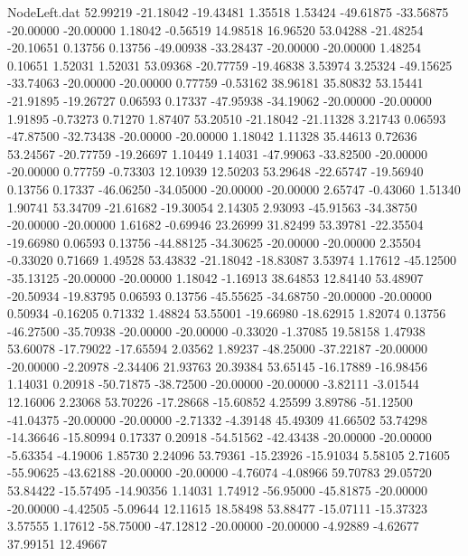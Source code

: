 \begin{filecontents}{NodeLeft.dat}
  52.99219  -21.18042  -19.43481     1.35518    1.53424  -49.61875  -33.56875  -20.00000  -20.00000    1.18042   -0.56519   14.98518   16.96520
  53.04288  -21.48254  -20.10651     0.13756    0.13756  -49.00938  -33.28437  -20.00000  -20.00000    1.48254    0.10651    1.52031    1.52031
  53.09368  -20.77759  -19.46838     3.53974    3.25324  -49.15625  -33.74063  -20.00000  -20.00000    0.77759   -0.53162   38.96181   35.80832
  53.15441  -21.91895  -19.26727     0.06593    0.17337  -47.95938  -34.19062  -20.00000  -20.00000    1.91895   -0.73273    0.71270    1.87407
  53.20510  -21.18042  -21.11328     3.21743    0.06593  -47.87500  -32.73438  -20.00000  -20.00000    1.18042    1.11328   35.44613    0.72636
  53.24567  -20.77759  -19.26697     1.10449    1.14031  -47.99063  -33.82500  -20.00000  -20.00000    0.77759   -0.73303   12.10939   12.50203
  53.29648  -22.65747  -19.56940     0.13756    0.17337  -46.06250  -34.05000  -20.00000  -20.00000    2.65747   -0.43060    1.51340    1.90741
  53.34709  -21.61682  -19.30054     2.14305    2.93093  -45.91563  -34.38750  -20.00000  -20.00000    1.61682   -0.69946   23.26999   31.82499
  53.39781  -22.35504  -19.66980     0.06593    0.13756  -44.88125  -34.30625  -20.00000  -20.00000    2.35504   -0.33020    0.71669    1.49528
  53.43832  -21.18042  -18.83087     3.53974    1.17612  -45.12500  -35.13125  -20.00000  -20.00000    1.18042   -1.16913   38.64853   12.84140
  53.48907  -20.50934  -19.83795     0.06593    0.13756  -45.55625  -34.68750  -20.00000  -20.00000    0.50934   -0.16205    0.71332    1.48824
  53.55001  -19.66980  -18.62915     1.82074    0.13756  -46.27500  -35.70938  -20.00000  -20.00000   -0.33020   -1.37085   19.58158    1.47938
  53.60078  -17.79022  -17.65594     2.03562    1.89237  -48.25000  -37.22187  -20.00000  -20.00000   -2.20978   -2.34406   21.93763   20.39384
  53.65145  -16.17889  -16.98456     1.14031    0.20918  -50.71875  -38.72500  -20.00000  -20.00000   -3.82111   -3.01544   12.16006    2.23068
  53.70226  -17.28668  -15.60852     4.25599    3.89786  -51.12500  -41.04375  -20.00000  -20.00000   -2.71332   -4.39148   45.49309   41.66502
  53.74298  -14.36646  -15.80994     0.17337    0.20918  -54.51562  -42.43438  -20.00000  -20.00000   -5.63354   -4.19006    1.85730    2.24096
  53.79361  -15.23926  -15.91034     5.58105    2.71605  -55.90625  -43.62188  -20.00000  -20.00000   -4.76074   -4.08966   59.70783   29.05720
  53.84422  -15.57495  -14.90356     1.14031    1.74912  -56.95000  -45.81875  -20.00000  -20.00000   -4.42505   -5.09644   12.11615   18.58498
  53.88477  -15.07111  -15.37323     3.57555    1.17612  -58.75000  -47.12812  -20.00000  -20.00000   -4.92889   -4.62677   37.99151   12.49667

\end{filecontents}
